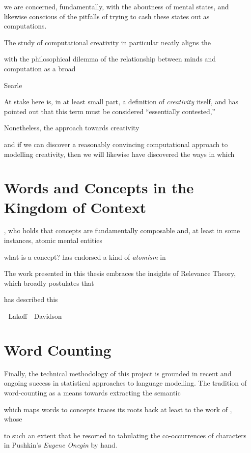 we are concerned, fundamentally, with the aboutness of mental states, and likewise conscious of the pitfalls of trying to cash these states out as computations.

The study of computational creativity in particular neatly aligns the 

with the philosophical dilemma of the relationship between minds and computation as a broad

Searle

At stake here is, in at least small part, a definition of \emph{creativity} itself, and \cite{Colton} has pointed out that this term must be considered ``essentially contested,''

Nonetheless, the approach towards creativity 

and if we can discover a reasonably convincing computational approach to modelling creativity, then we will likewise have discovered the ways in which 

\section{Words and Concepts in the Kingdom of Context}
\cite{Fodor}, who holds that concepts are fundamentally composable and, at least in some instances, atomic mental entities

what is a concept?  \cite{Fodor} has endorsed a kind of \emph{atomism} in 

\citep[cf][for a case against conceptual schema in general]{Davidson}

The work presented in this thesis embraces the insights of Relevance Theory, which broadly postulates that 

\cite{Carston} has described this 

- Lakoff
- Davidson



\section{Word Counting}
Finally, the technical methodology of this project is grounded in recent and ongoing success in statistical approaches to language modelling.  The tradition of word-counting as a means towards extracting the semantic 

which maps words to concepts traces its roots back at least to the work of \cite{Markov}, whose

to such an extent that he resorted to tabulating the co-occurrences of characters in Pushkin's \emph{Eugene Onegin} by hand.

